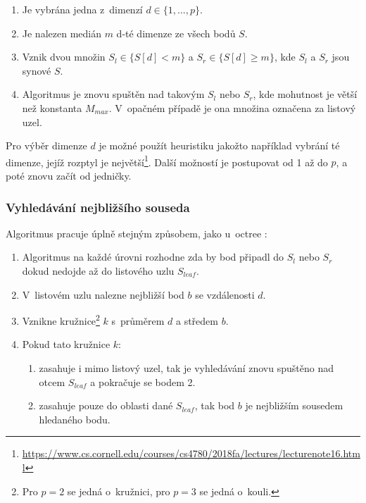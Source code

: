 \begin{enumerate}
    \item Je vybrána jedna z~dimenzí $d \in \{1, ... ,p\}$.
    \item Je nalezen medián $m$ d-té dimenze ze všech bodů $S$.
    \item Vznik dvou množin $S_l \in \{ S[d] < m \}$ a $S_r \in \{ S[d] \geq m \}$, kde $S_l$ a $S_r$ jsou synové $S$.
    \item Algoritmus je znovu spuštěn nad takovým $S_l$ nebo $S_r$, kde mohutnost je větší než konstanta $M_{max}$. V~opačném případě je ona množina označena za listový uzel.
\end{enumerate}

Pro výběr dimenze $d$ je možné použít heuristiku jakožto například vybrání té dimenze, jejíž rozptyl je největší\footnote{\label{note:baltree}\url{https://www.cs.cornell.edu/courses/cs4780/2018fa/lectures/lecturenote16.html}}. Další možností je postupovat od 1 až do $p$, a poté znovu začít od jedničky. 



\subsubsection{Vyhledávání nejbližšího souseda}
Algoritmus pracuje úplně stejným způsobem, jako u~octree \cite{kdimensiontree}:
\begin{enumerate}
    \item Algoritmus na každé úrovni rozhodne zda by bod připadl do $S_l$ nebo $S_r$ dokud nedojde až do listového uzlu $S_{leaf}$.
    \item V~listovém uzlu nalezne nejbližší bod $b$ se vzdálenosti $d$.
    \item Vznikne kružnice\footnote{Pro $p=2$ se jedná o~kružnici, pro $p=3$ se jedná o~kouli. } $k$ s~průměrem $d$ a středem $b$. 
    \item Pokud tato kružnice $k$:
    \begin{enumerate}
        \item zasahuje i mimo listový uzel, tak je vyhledávání znovu spuštěno nad otcem $S_{leaf}$ a pokračuje se bodem 2.
        \item zasahuje pouze do oblasti dané $S_ {leaf}$, tak bod $b$ je nejbližším sousedem hledaného bodu.
    \end{enumerate}
\end{enumerate}
 




